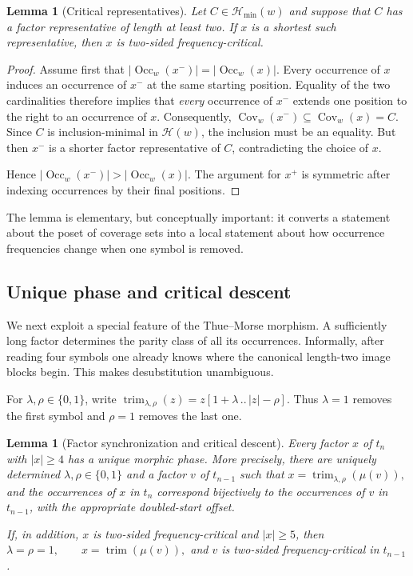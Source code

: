 \documentclass[11pt,a4paper]{article}
\newtheorem{lemma}[theorem]{Lemma}
\theoremstyle{definition}\newtheorem{definition}[theorem]{Definition}
\theoremstyle{remark}\newtheorem{remark}[theorem]{Remark}
\newcommand{\Occ}{\operatorname{Occ}}
\newcommand{\Cov}{\operatorname{Cov}}
\newcommand{\Hmin}{\mathcal{H}_{\min}}
\begin{document}
\begin{lemma}[Critical representatives]
\label{lem:critical-representatives}
Let $C\in\Hmin(w)$ and suppose that $C$ has a factor representative of length at least two.  If $x$ is a shortest such representative, then $x$ is two-sided frequency-critical.
\end{lemma}

\begin{proof}
Assume first that
$
 |\Occ_w(x^-)|=|\Occ_w(x)|.
$
Every occurrence of $x$ induces an occurrence of $x^-$ at the same starting position.  Equality of the two cardinalities therefore implies that \emph{every} occurrence of $x^-$ extends one position to the right to an occurrence of $x$.  Consequently,
$
 \Cov_w(x^-)\subseteq\Cov_w(x)=C.
$
Since $C$ is inclusion-minimal in $\mathcal H(w)$, the inclusion must be an equality.  But then $x^-$ is a shorter factor representative of $C$, contradicting the choice of $x$.

Hence $|\Occ_w(x^-)|>|\Occ_w(x)|$.  The argument for $x^+$ is symmetric after indexing occurrences by their final positions.
\end{proof}

The lemma is elementary, but conceptually important: it converts a statement about the poset of coverage sets into a local statement about how occurrence frequencies change when one symbol is removed.

\subsection{Unique phase and critical descent}
\label{subsec:critical-descent}

We next exploit a special feature of the Thue--Morse morphism.  A sufficiently long factor determines the parity class of all its occurrences.  Informally, after reading four symbols one already knows where the canonical length-two image blocks begin.  This makes desubstitution unambiguous.

For $\lambda,\rho\in\{0,1\}$, write
$
 \operatorname{trim}_{\lambda,\rho}(z)
   =z[1+\lambda\, ..\, |z|-\rho].
$
Thus $\lambda=1$ removes the first symbol and $\rho=1$ removes the last one.

\begin{lemma}[Factor synchronization and critical descent]
\label{lem:factor-critical-descent}
Every factor $x$ of $t_n$ with $|x|\ge4$ has a unique morphic phase.  More precisely, there are uniquely determined $\lambda,\rho\in\{0,1\}$ and a factor $v$ of $t_{n-1}$ such that
$
 x=\operatorname{trim}_{\lambda,\rho}(\mu(v)),
$
and the occurrences of $x$ in $t_n$ correspond bijectively to the occurrences of $v$ in $t_{n-1}$, with the appropriate doubled-start offset.

If, in addition, $x$ is two-sided frequency-critical and $|x|\ge5$, then
$
 \lambda=\rho=1,
 \qquad
 x=\operatorname{trim}(\mu(v)),
$
and $v$ is two-sided frequency-critical in $t_{n-1}$.
\end{lemma}
\end{document}
